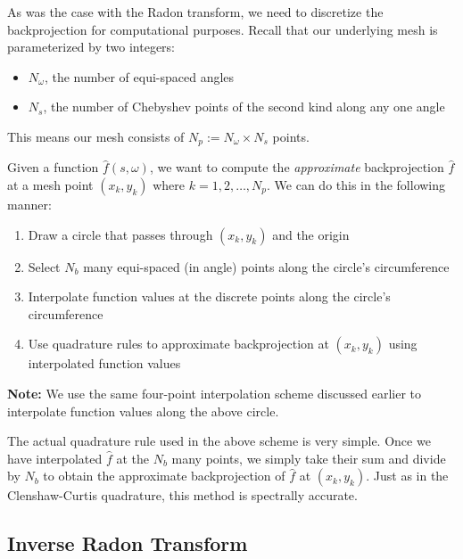 As was the case with the Radon transform, we need to discretize the backprojection for computational purposes.
Recall that our underlying mesh is parameterized by two integers:
\begin{itemize}
    \item $N_{\omega}$, the number of equi-spaced angles
    \item $N_{s}$, the number of Chebyshev points of the second kind along any one angle
\end{itemize}
This means our mesh consists of $N_{p} := N_{\omega} \times N_{s}$ points.
\par 
Given a function $\widehat{f} \left( s, \omega \right)$, we want to compute the \textit{approximate} backprojection $\widehat{f}$ at a mesh point $\left( x_{k}, y_{k} \right)$ where $k = 1, 2, \hdots, N_{p}$.
We can do this in the following manner:
\begin{enumerate}
    \item Draw a circle that passes through $\left( x_{k}, y_{k} \right)$ and the origin
    \item Select $N_{b}$ many equi-spaced (in angle) points along the circle's circumference
    \item Interpolate function values at the discrete points along the circle's circumference
    \item Use quadrature rules to approximate backprojection at $\left( x_{k}, y_{k} \right)$ using interpolated function values
\end{enumerate}
\textbf{Note:} We use the same four-point interpolation scheme discussed earlier to interpolate function values along the above circle.
\par 
The actual quadrature rule used in the above scheme is very simple.
Once we have interpolated $\widehat{f}$ at the $N_{b}$ many points, we simply take their sum and divide by $N_{b}$ to obtain the approximate backprojection of $\widehat{f}$ at $\left( x_{k}, y_{k} \right)$.
Just as in the Clenshaw-Curtis quadrature, this method is spectrally accurate.

\subsection{Inverse Radon Transform}

